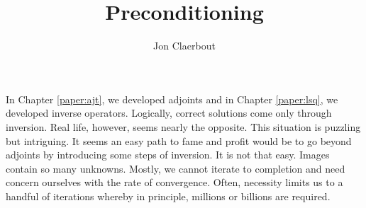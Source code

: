 
\def\sx#1{}
\def\bx#1{#1}
\def\eq{\quad =\quad}

\title{Preconditioning}
\author{Jon Claerbout}
\maketitle

\label{paper:prc}
\sx{precondition}


\par
In Chapter \ref{paper:ajt}, we developed adjoints and
in Chapter \ref{paper:lsq}, we developed inverse operators.
Logically, correct solutions come only through inversion.
Real life, however, seems nearly the opposite.
This situation is puzzling but intriguing.
It seems an easy path to fame and profit would
be to go beyond adjoints by introducing
some steps of inversion.
It is not that easy.
Images contain so many unknowns.
Mostly, we cannot iterate to completion
and need concern ourselves with the rate of convergence.
Often, necessity limits us to a handful
of iterations whereby in principle,
millions or billions are required.

